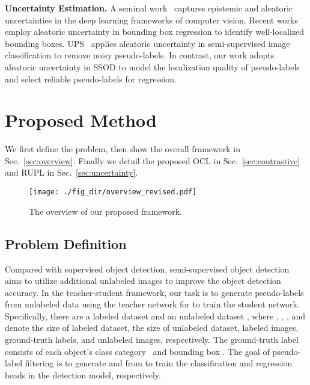 \documentclass{bmvc2k}
\begin{document}
\noindent\textbf{Uncertainty Estimation.}
A seminal work~\cite{whatUncertainty} captures epistemic and aleatoric uncertainties in the deep learning frameworks of computer vision. Recent works~\cite{box_regression_uncertainty, gaussianyolo} employ aleatoric uncertainty in bounding box regression to identify well-localized bounding boxes. UPS~\cite{rizve2021in} applies aleatoric uncertainty in semi-supervised image classification to remove noisy pseudo-labels. In contrast, our work adopts aleatoric uncertainty in SSOD to model the localization quality of pseudo-labels and select reliable pseudo-labels for regression.

\section{Proposed Method}
\label{sec:methods}
We first define the problem, then show the overall framework in Sec.~\ref{sec:overview}.
Finally we detail the proposed OCL in Sec.~\ref{sec:contrastive}
and RUPL in Sec.~\ref{sec:uncertainty}.

\begin{figure}[t]
    \centering
    \texttt{[image: ./fig\_dir/overview\_revised.pdf]}
    \caption{The overview of our proposed framework.
    }
    \label{fig:overview}
\end{figure}

\subsection{Problem Definition}
Compared with supervised object detection, semi-supervised object detection aims to utilize additional unlabeled images to improve the object detection accuracy. In the teacher-student framework, our task is to generate pseudo-labels from unlabeled data using the teacher network for to train the student network.  Specifically, there are a labeled dataset  and an unlabeled dataset , where , , ,  and   denote the size of labeled dataset, the size of unlabeled dataset, labeled images, ground-truth labels, and unlabeled images, respectively. The ground-truth label~ consists of each object's class category~ and bounding box .
The goal of pseudo-label filtering is to generate  and   from  to train the classification and regression heads in the detection model, respectively.
\end{document}
